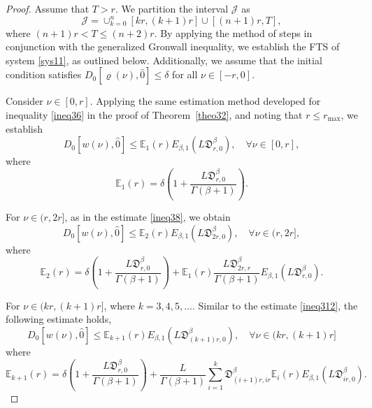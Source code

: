 \documentclass[reqno]{amsart}
\begin{document}
\begin{proof}
Assume that \( T > r \). We partition the interval \( \mathcal{J} \) as
\[
\mathcal{J} = \cup_{k=0}^{n} [k r, (k+1) r] \cup [(n+1) r, T],
\]
where \( (n+1) r < T \leq (n+2) r \). By applying the method of steps in conjunction 
with the generalized Gronwall inequality, we establish the FTS of system \eqref{sys11}, 
as outlined below. Additionally, we assume that the initial condition satisfies 
\( D_0[\varrho(\nu ), \hat{0}] \leq \delta \) for all \( \nu \in [- r, 0] \).

Consider $\nu \in [0, r]$. Applying the same estimation method developed for inequality 
\eqref{ineq36} in the proof of Theorem~\ref{theo32}, and noting that $ r \leq r_{\max}$, 
we establish
\begin{equation}\label{ineq324}
D_0[ w(\nu ), \hat{0}] \leq \mathbb{E}_{1}( r) E_{\beta, 1}
( L\mathfrak{D}_{ r,0}^{\beta}), \quad \forall \nu \in[0, r], \tag{3.24}
\end{equation}
where
\begin{equation}\label{eq325}
\mathbb{E}_{1}( r)=\delta(1+\frac{ L\mathfrak{D}_{ r,0}^{\beta}}{\Gamma(\beta+1)}) .
\end{equation}

 For $\nu \in( r, 2 r]$, as in the estimate \eqref{ineq38}, we obtain
\begin{equation}\label{ineq326}
D_0[ w(\nu ), \hat{0}] \leq \mathbb{E}_{2}( r) E_{\beta, 1}
( L\mathfrak{D}_{2 r,0}^{\beta}), \quad \forall \nu \in( r, 2 r], 
\end{equation}
where
$$
\mathbb{E}_{2}( r)=\delta(1+\frac{ L\mathfrak{D}_{ r,0}^{\beta}}{\Gamma(\beta+1)})
+\mathbb{E}_{1}( r) \frac{ L\mathfrak{D}_{2 r, r}^{\beta}}{\Gamma(\beta+1)} E_{\beta, 1}
( L\mathfrak{D}_{ r,0}^{\beta}).
$$

For $\nu \in(k r,(k+1) r]$, where $k=3,4,5, \ldots$. Similar to the estimate 
\eqref{ineq312}, the following estimate holds,
\begin{equation}\label{ineq327}
D_0[ w(\nu ), \hat{0}] \leq \mathbb{E}_{k+1}( r) E_{\beta, 1}
( L\mathfrak{D}_{(k+1) r,0}^{\beta}), \quad \forall \nu \in(k r,(k+1) r] 
\end{equation}
where
$$
\mathbb{E}_{k+1}( r)
=  \delta(1+\frac{ L\mathfrak{D}_{ r,0}^{\beta}}{\Gamma(\beta+1)})
 +\frac{ L}{\Gamma(\beta+1)} \sum_{i=1}^{k}\mathfrak{D}_{(i+1) r,i r}^{\beta}
  \mathbb{E}_{i}( r) E_{\beta, 1}( L\mathfrak{D}_{i r,0}^{\beta}).
$$


\end{proof}
\end{document}

